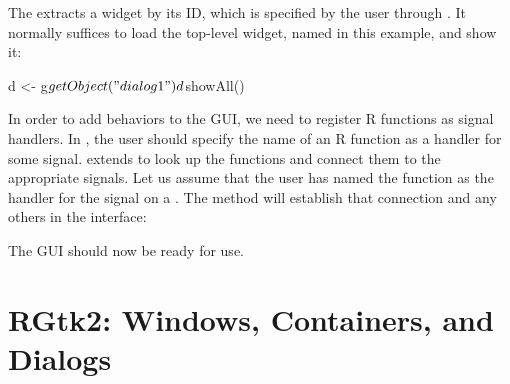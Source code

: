 The  extracts a widget by its ID, which
is specified by the user through . It normally
suffices to load the top-level widget, named  in this
example, and show it:
\begin{Schunk}
\begin{Sinput}
 d <- g$getObject("dialog1")
 d$showAll()
\end{Sinput}
\end{Schunk}

In order to add behaviors to the GUI, we need to register R functions
as signal handlers. In , the user should specify the
name of an R function as a handler for some signal. 
extends  to look up the functions and connect them
to the appropriate signals. Let us assume that the user has named the
 function as the handler for the
 signal on a . The
 method will establish that
connection and any others in the interface:
\begin{Schunk}
\end{Schunk}
% 
The GUI should now be ready for use.






\chapter{RGtk2: Windows, Containers, and Dialogs}
\label{sec:top-level-windows}




